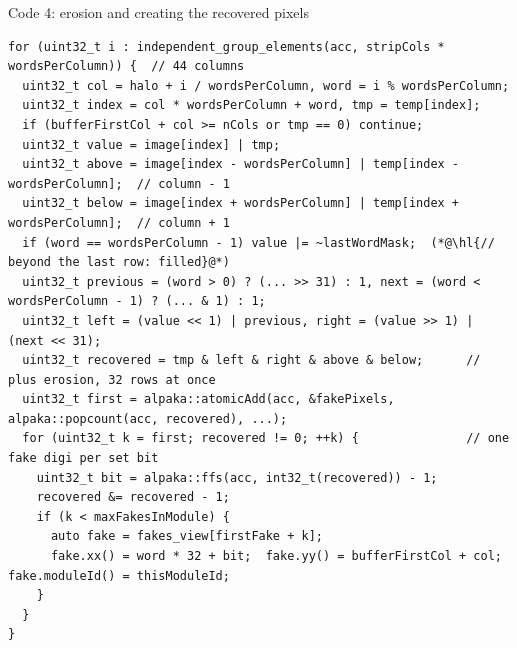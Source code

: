 \documentclass[aspectratio=169,10pt,xcolor=table]{beamer}
\newcommand{\hl}[1]{\colorbox{cbOrange!25}{#1}}
\begin{document}
\begin{frame}[fragile]{Code 4: erosion and creating the recovered pixels}
\begin{lstlisting}
for (uint32_t i : independent_group_elements(acc, stripCols * wordsPerColumn)) {  // 44 columns
  uint32_t col = halo + i / wordsPerColumn, word = i % wordsPerColumn;
  uint32_t index = col * wordsPerColumn + word, tmp = temp[index];
  if (bufferFirstCol + col >= nCols or tmp == 0) continue;
  uint32_t value = image[index] | tmp;
  uint32_t above = image[index - wordsPerColumn] | temp[index - wordsPerColumn];  // column - 1
  uint32_t below = image[index + wordsPerColumn] | temp[index + wordsPerColumn];  // column + 1
  if (word == wordsPerColumn - 1) value |= ~lastWordMask;  (*@\hl{// beyond the last row: filled}@*)
  uint32_t previous = (word > 0) ? (... >> 31) : 1, next = (word < wordsPerColumn - 1) ? (... & 1) : 1;
  uint32_t left = (value << 1) | previous, right = (value >> 1) | (next << 31);
  uint32_t recovered = tmp & left & right & above & below;      // plus erosion, 32 rows at once
  uint32_t first = alpaka::atomicAdd(acc, &fakePixels, alpaka::popcount(acc, recovered), ...);
  for (uint32_t k = first; recovered != 0; ++k) {               // one fake digi per set bit
    uint32_t bit = alpaka::ffs(acc, int32_t(recovered)) - 1;
    recovered &= recovered - 1;
    if (k < maxFakesInModule) {
      auto fake = fakes_view[firstFake + k];
      fake.xx() = word * 32 + bit;  fake.yy() = bufferFirstCol + col;  fake.moduleId() = thisModuleId;
    }
  }
}
\end{lstlisting}
\end{frame}

\end{document}
